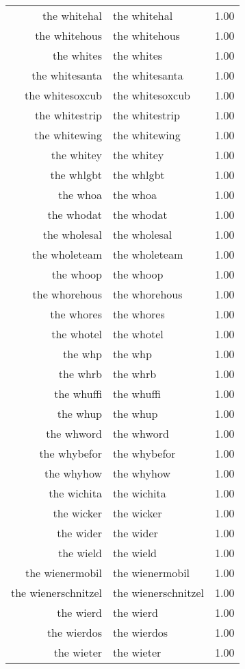 \begin{table}[ht]
\begin{tabular}{rlr}
  the whitehal & the whitehal & 1.00 \\ 
  the whitehous & the whitehous & 1.00 \\ 
  the whites & the whites & 1.00 \\ 
  the whitesanta & the whitesanta & 1.00 \\ 
  the whitesoxcub & the whitesoxcub & 1.00 \\ 
  the whitestrip & the whitestrip & 1.00 \\ 
  the whitewing & the whitewing & 1.00 \\ 
  the whitey & the whitey & 1.00 \\ 
  the whlgbt & the whlgbt & 1.00 \\ 
  the whoa & the whoa & 1.00 \\ 
  the whodat & the whodat & 1.00 \\ 
  the wholesal & the wholesal & 1.00 \\ 
  the wholeteam & the wholeteam & 1.00 \\ 
  the whoop & the whoop & 1.00 \\ 
  the whorehous & the whorehous & 1.00 \\ 
  the whores & the whores & 1.00 \\ 
  the whotel & the whotel & 1.00 \\ 
  the whp & the whp & 1.00 \\ 
  the whrb & the whrb & 1.00 \\ 
  the whuffi & the whuffi & 1.00 \\ 
  the whup & the whup & 1.00 \\ 
  the whword & the whword & 1.00 \\ 
  the whybefor & the whybefor & 1.00 \\ 
  the whyhow & the whyhow & 1.00 \\ 
  the wichita & the wichita & 1.00 \\ 
  the wicker & the wicker & 1.00 \\ 
  the wider & the wider & 1.00 \\ 
  the wield & the wield & 1.00 \\ 
  the wienermobil & the wienermobil & 1.00 \\ 
  the wienerschnitzel & the wienerschnitzel & 1.00 \\ 
  the wierd & the wierd & 1.00 \\ 
  the wierdos & the wierdos & 1.00 \\ 
  the wieter & the wieter & 1.00 \\ 

\end{tabular}
\end{table}
